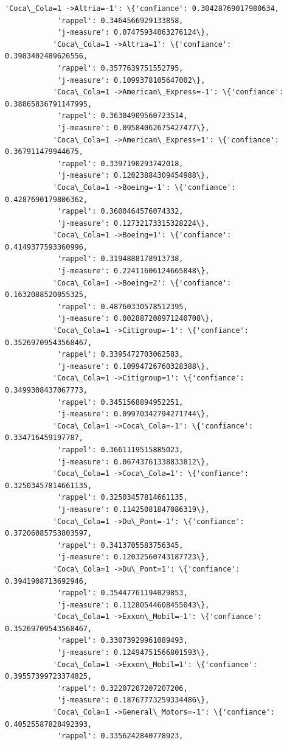 \documentclass[11pt]{article}
\begin{document}
\begin{Verbatim}[commandchars=\\\{\}]
           'Coca\_Cola=1 ->Altria=-1': \{'confiance': 0.30428769017980634,
            'rappel': 0.3464566929133858,
            'j-measure': 0.07475934063276124\},
           'Coca\_Cola=1 ->Altria=1': \{'confiance': 0.3983402489626556,
            'rappel': 0.3577639751552795,
            'j-measure': 0.1099378105647002\},
           'Coca\_Cola=1 ->American\_Express=-1': \{'confiance': 0.38865836791147995,
            'rappel': 0.36304909560723514,
            'j-measure': 0.09584062675427477\},
           'Coca\_Cola=1 ->American\_Express=1': \{'confiance': 0.367911479944675,
            'rappel': 0.3397190293742018,
            'j-measure': 0.12023884309454988\},
           'Coca\_Cola=1 ->Boeing=-1': \{'confiance': 0.4287690179806362,
            'rappel': 0.3600464576074332,
            'j-measure': 0.12732173315328224\},
           'Coca\_Cola=1 ->Boeing=1': \{'confiance': 0.4149377593360996,
            'rappel': 0.3194888178913738,
            'j-measure': 0.22411606124665848\},
           'Coca\_Cola=1 ->Boeing=2': \{'confiance': 0.1632088520055325,
            'rappel': 0.48760330578512395,
            'j-measure': 0.002887208971240708\},
           'Coca\_Cola=1 ->Citigroup=-1': \{'confiance': 0.35269709543568467,
            'rappel': 0.3395472703062583,
            'j-measure': 0.10994726760328388\},
           'Coca\_Cola=1 ->Citigroup=1': \{'confiance': 0.3499308437067773,
            'rappel': 0.3451568894952251,
            'j-measure': 0.09970342794271744\},
           'Coca\_Cola=1 ->Coca\_Cola=-1': \{'confiance': 0.334716459197787,
            'rappel': 0.3661119515885023,
            'j-measure': 0.06743761338833812\},
           'Coca\_Cola=1 ->Coca\_Cola=1': \{'confiance': 0.32503457814661135,
            'rappel': 0.32503457814661135,
            'j-measure': 0.11425081847086319\},
           'Coca\_Cola=1 ->Du\_Pont=-1': \{'confiance': 0.37206085753803597,
            'rappel': 0.3413705583756345,
            'j-measure': 0.12032560743187723\},
           'Coca\_Cola=1 ->Du\_Pont=1': \{'confiance': 0.3941908713692946,
            'rappel': 0.35447761194029853,
            'j-measure': 0.11280544608455043\},
           'Coca\_Cola=1 ->Exxon\_Mobil=-1': \{'confiance': 0.35269709543568467,
            'rappel': 0.33073929961089493,
            'j-measure': 0.12494751566801593\},
           'Coca\_Cola=1 ->Exxon\_Mobil=1': \{'confiance': 0.39557399723374825,
            'rappel': 0.32207207207207206,
            'j-measure': 0.18767773259334486\},
           'Coca\_Cola=1 ->General\_Motors=-1': \{'confiance': 0.40525587828492393,
            'rappel': 0.3356242840778923,

\end{Verbatim}
\end{document}
